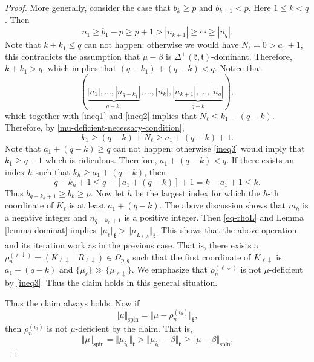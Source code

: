 \documentclass[11pt]{amsart}
\theoremstyle{plain}
\theoremstyle{definition}
\newtheorem{rmk}[thm]{Remark}
\newcommand{\frk}{\mathfrak{k}}
\newcommand{\frt}{\mathfrak{t}}
\begin{document}
\begin{proof}
	More generally, consider the case that $b_{k}\ge p$ and $b_{k+1}<p$. Here $1\leq k<q$. Then
	\begin{equation}\label{ineq2}
	n_1\ge b_1-p\ge p+1>|n_{k+1}|\ge\cdots \ge |n_q|.
	\end{equation}
Note that $k+k_1\le q$ can not happen: otherwise we would have $N_{\ell}=0>a_1+1$, this contradicts the assumption that $\mu-\beta$ is $\Delta^+(\frk, \frt)$-dominant. Therefore,  $k+k_1>q$, which implies that $(q-k_1)+(q-k)<q$. Notice that
\[(\underbrace{|n_1|,\dots,|n_{q-k_1}|}_{q-k_1},\dots,|n_{k}|,\underbrace{|n_{k+1}|,\dots,|n_{q}|}_{q-k}),\]
which together with \eqref{ineq1} and \eqref{ineq2} implies that $N_{\ell}\le k_1-(q-k)$. Therefore, by \eqref{mu-deficient-necessary-condition},
\begin{equation}\label{ineq3}
k_1\ge (q-k)+N_{\ell} \ge a_1+(q-k)+1.
\end{equation}
Note that $a_1+(q-k)\ge q$
can not happen: otherwise \eqref{ineq3} would imply that $k_1\ge q+1$ which is ridiculous. Therefore, $a_1+(q-k)<q$. If there exists an index $h$ such that $k_h\ge a_1+(q-k)$, then
	\[q-k_h+1\le q-[a_1+(q-k)]+1=k-a_1+1\le k.\]
	Thus  $b_{q-k_h+1}\ge b_k\ge p$. Now let $h$ be the largest index for which the $h$-th coordinate of $K_\ell$ is at least $a_1+(q-k)$. The above discussion shows that $m_h$ is a negative integer and $n_{q-k_h+1}$ is a positive integer. Then \eqref{eq-rhoL} and Lemma \ref{lemma-dominat} implies $\Vert\mu_\ell\Vert_\frk>\Vert \mu_{L_{\ell, h}}\Vert_\frk$. This shows that the above operation and its iteration work as in the previous case. That is, there exists a $\rho_n^{(\ell\downarrow)}=(K_{\ell\downarrow}\mid R_{\ell\downarrow})\in \Omega_{p, q}$ such that the first coordinate of $K_{\ell\downarrow}$ is $a_1+(q-k)$ and $\{\mu_\ell\}\gg\{\mu_{\ell\downarrow}\}$. We emphasize that $\rho_n^{(\ell\downarrow)}$ is not $\mu$-deficient by \eqref{ineq3}. Thus the claim holds in this general situation.

Thus the claim always holds. Now if \[\Vert\mu\Vert_{\mathrm{spin}}=\Vert\mu-\rho_n^{(i_0)}\Vert_{\mathfrak{k}},\] then $\rho_n^{(i_0)}$ is not $\mu$-deficient by the claim. That is,
	\[\Vert\mu\Vert_{\mathrm{spin}}=\Vert\mu_{i_0}\Vert_\frk>\Vert\mu_{i_0}-\beta\Vert_\frk\ge \Vert\mu-\beta\Vert_{\mathrm{spin}}.\]
\end{proof}

\end{document}
